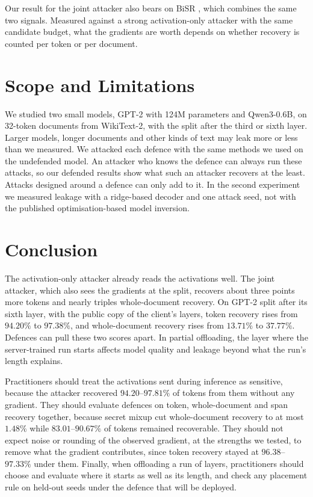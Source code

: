 \documentclass[11pt]{article}
\begin{document}
Our result for the joint attacker also bears on BiSR \cite{bisr2024}, which combines the same two signals. Measured against a strong activation-only attacker with the same candidate budget, what the gradients are worth depends on whether recovery is counted per token or per document.

\section{Scope and Limitations}
\label{sec:limitations}
We studied two small models, GPT-2 with 124M parameters and Qwen3-0.6B, on 32-token documents from WikiText-2, with the split after the third or sixth layer. Larger models, longer documents and other kinds of text may leak more or less than we measured. We attacked each defence with the same methods we used on the undefended model. An attacker who knows the defence can always run these attacks, so our defended results show what such an attacker recovers at the least. Attacks designed around a defence can only add to it. In the second experiment we measured leakage with a ridge-based decoder and one attack seed, not with the published optimisation-based model inversion.

\section{Conclusion}
\label{sec:conclusion}
The activation-only attacker already reads the activations well. The joint attacker, which also sees the gradients at the split, recovers about three points more tokens and nearly triples whole-document recovery. On GPT-2 split after its sixth layer, with the public copy of the client's layers, token recovery rises from $94.20\%$ to $97.38\%$, and whole-document recovery rises from $13.71\%$ to $37.77\%$. Defences can pull these two scores apart. In partial offloading, the layer where the server-trained run starts affects model quality and leakage beyond what the run's length explains.

Practitioners should treat the activations sent during inference as sensitive, because the attacker recovered $94.20$--$97.81\%$ of tokens from them without any gradient. They should evaluate defences on token, whole-document and span recovery together, because secret mixup cut whole-document recovery to at most $1.48\%$ while $83.01$--$90.67\%$ of tokens remained recoverable. They should not expect noise or rounding of the observed gradient, at the strengths we tested, to remove what the gradient contributes, since token recovery stayed at $96.38$--$97.33\%$ under them. Finally, when offloading a run of layers, practitioners should choose and evaluate where it starts as well as its length, and check any placement rule on held-out seeds under the defence that will be deployed.
\end{document}

